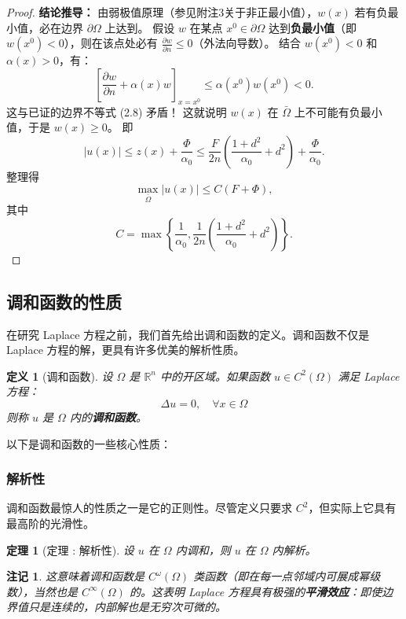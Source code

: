 \documentclass[12pt,a4paper]{ctexart}
\newtheorem*{note}{注记}
\newtheorem{theorem}{定理}[section]
\newtheorem{definition}{定义}
\begin{document}
\begin{proof}
		\textbf{结论推导：}
		由弱极值原理（参见附注3关于非正最小值），$w(x)$ 若有负最小值，必在边界 $\partial \Omega$ 上达到。
		假设 $w$ 在某点 $x^0 \in \partial \Omega$ 达到\textbf{负最小值}（即 $w(x^0) < 0$），则在该点处必有 $\frac{\partial w}{\partial n} \le 0$（外法向导数）。
		结合 $w(x^0) < 0$ 和 $\alpha(x) > 0$，有：
		\[
		\left[ \frac{\partial w}{\partial n} + \alpha(x)w \right]_{x=x^0} \le \alpha(x^0) w(x^0) < 0.
		\]
		这与已证的边界不等式 (2.8) 矛盾！
		这就说明 $w(x)$ 在 $\bar{\Omega}$ 上不可能有负最小值，于是 $w(x) \ge 0$。
		即
		\[
		|u(x)| \le z(x) + \frac{\Phi}{\alpha_0} \le \frac{F}{2n} \left( \frac{1+d^2}{\alpha_0} + d^2 \right) + \frac{\Phi}{\alpha_0}.
		\]
		整理得
		\[
		\max_{\bar{\Omega}} |u(x)| \le C(F + \Phi),
		\]
		其中
		\[
		C = \max \left\{ \frac{1}{\alpha_0}, \frac{1}{2n} \left( \frac{1+d^2}{\alpha_0} + d^2 \right) \right\}.
		\]
	\end{proof}
	
	
	\subsection{调和函数的性质}
	
	在研究 Laplace 方程之前，我们首先给出调和函数的定义。调和函数不仅是 Laplace 方程的解，更具有许多优美的解析性质。
	
	\begin{definition}[调和函数]
		设 $\Omega$ 是 $\mathbb{R}^n$ 中的开区域。如果函数 $u \in C^2(\Omega)$ 满足 Laplace 方程：
		\begin{equation}
			\Delta u = 0, \quad \forall x \in \Omega
		\end{equation}
		则称 $u$ 是 $\Omega$ 内的\textbf{调和函数}。
	\end{definition}
	
	以下是调和函数的一些核心性质：
	
	\subsubsection{解析性}
	
	调和函数最惊人的性质之一是它的正则性。尽管定义只要求 $C^2$，但实际上它具有最高阶的光滑性。
	
	\begin{theorem}[定理 : 解析性]
		设 $u$ 在 $\Omega$ 内调和，则 $u$ 在 $\Omega$ 内解析。
	\end{theorem}
	
	\begin{note}
		这意味着调和函数是 $C^\omega(\Omega)$ 类函数（即在每一点邻域内可展成幂级数），当然也是 $C^\infty(\Omega)$ 的。这表明 Laplace 方程具有极强的\textbf{平滑效应}：即使边界值只是连续的，内部解也是无穷次可微的。
	\end{note}
	
\end{document}
